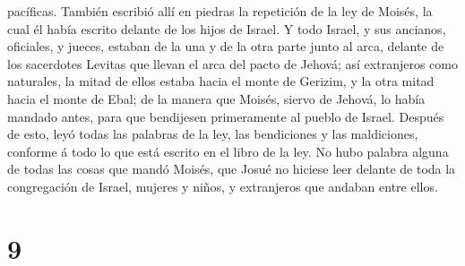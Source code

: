 pacíficas.  También escribió allí en piedras la repetición
de la ley de Moisés, la cual él había escrito delante de los hijos de
Israel.  Y todo Israel, y sus ancianos, oficiales, y
jueces, estaban de la una y de la otra parte junto al arca, delante de
los sacerdotes Levitas que llevan el arca del pacto de Jehová; así
extranjeros como naturales, la mitad de ellos estaba hacia el monte de
Gerizim, y la otra mitad hacia el monte de Ebal; de la manera que
Moisés, siervo de Jehová, lo había mandado antes, para que bendijesen
primeramente al pueblo de Israel.  Después de esto, leyó
todas las palabras de la ley, las bendiciones y las maldiciones,
conforme á todo lo que está escrito en el libro de la ley. 
No hubo palabra alguna de todas las cosas que mandó Moisés, que Josué no
hiciese leer delante de toda la congregación de Israel, mujeres y niños,
y extranjeros que andaban entre ellos.

\hypertarget{section-8}{%
\section{9}\label{section-8}}

